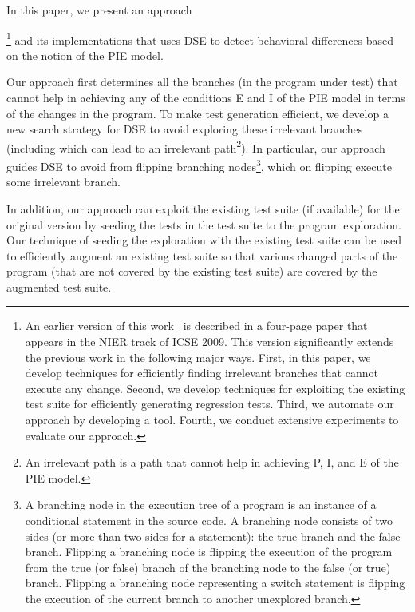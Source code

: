 In this paper, we present an approach{\footnote{\scriptsize{An earlier version of this work~\cite{taneja09:guided} is described in a four-page paper that appears in the NIER track of ICSE 2009. This
version significantly extends the previous work in the following major ways.
First, in this paper, we develop techniques for efficiently finding irrelevant branches 
that cannot execute any change. 
Second, we develop techniques for exploiting the existing test suite for efficiently generating regression tests.
Third, we automate our approach by developing a tool.
Fourth, we conduct extensive experiments to evaluate our approach.}}  and its implementations that uses DSE to detect behavioral differences based on the notion of the PIE model.

Our approach first determines all the branches (in the program under test) that cannot help in achieving any of the conditions E and I of the PIE model in terms of the changes in the program. To make test generation efficient, we develop a new search strategy for DSE to avoid exploring these irrelevant branches (including which can lead to an irrelevant path\footnote{\scriptsize{An irrelevant path is a path that cannot help in achieving P, I, and E of the PIE model.}}). In particular, our approach guides DSE to avoid from flipping branching nodes\footnote{\scriptsize{A branching node in the execution tree of a program is an instance of a conditional statement in the source code. A branching node consists of two sides (or more than two sides for a  statement): the true branch and the false branch. Flipping a branching node is flipping the execution of the program from the true (or false) branch of the branching node to the false (or true) branch. Flipping a branching node representing a switch statement is flipping the execution of the current branch to another unexplored branch.}}, which on flipping execute some irrelevant branch. 

In addition, our approach can exploit the existing test suite (if available) for the original version by seeding the tests in the test suite to the program exploration. Our technique of seeding the exploration with the existing test suite can be used to efficiently augment an existing test suite so that various changed parts of the program (that are not covered by the existing test suite) are covered by the augmented test suite. 


}
